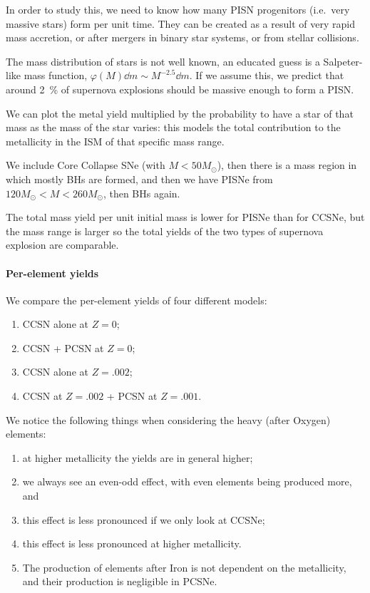 \documentclass[main.tex]{subfiles}
\begin{document}
In order to study this, we need to know how many PISN progenitors (i.e.\ very massive stars) form per unit time.
They can be created as a result of very rapid mass accretion, or after mergers in binary star systems, or from stellar collisions.

The mass distribution of stars is not well known, an educated guess is a Salpeter-like mass function, \(\varphi (M) \dd{m} \sim M^{-2.5} \dd{m}\).
If we assume this, we predict that around \SI{2}{\percent} of supernova explosions should be massive enough to form a PISN.

We can plot the metal yield multiplied by the probability to have a star of that mass as the mass of the star varies: this models the total contribution to the metallicity in the ISM of that specific mass range. 

We include Core Collapse SNe (with \(M < 50 M_{\odot}\)), then there is a mass region in which mostly BHs are formed, and then we have PISNe from \(120 M_{\odot}< M < 260 M_{\odot}\), then BHs again. 

The total mass yield per unit initial mass is lower for PISNe than for CCSNe, but the mass range is larger so the total yields of the two types of supernova explosion are comparable.

\paragraph{Per-element yields}

We compare the per-element yields of four different models:
\begin{enumerate}
    \item CCSN alone at \(Z=0\);
    \item CCSN + PCSN at \(Z=0\);
    \item CCSN alone at \(Z=\num{.002}\);
    \item CCSN at \(Z = \num{.002}\) + PCSN at \(Z=\num{.001}\).
\end{enumerate}

We notice the following things when considering the heavy (after Oxygen) elements: 
\begin{enumerate}
    \item at higher metallicity the yields are in general higher;
    \item we always see an even-odd effect, with even elements being produced more, and
    \item this effect is less pronounced if we only look at CCSNe;
    \item this effect is less pronounced at higher metallicity.
    \item The production of elements after Iron is not dependent on the metallicity, and their production is negligible in PCSNe.
\end{enumerate}
\end{document}
